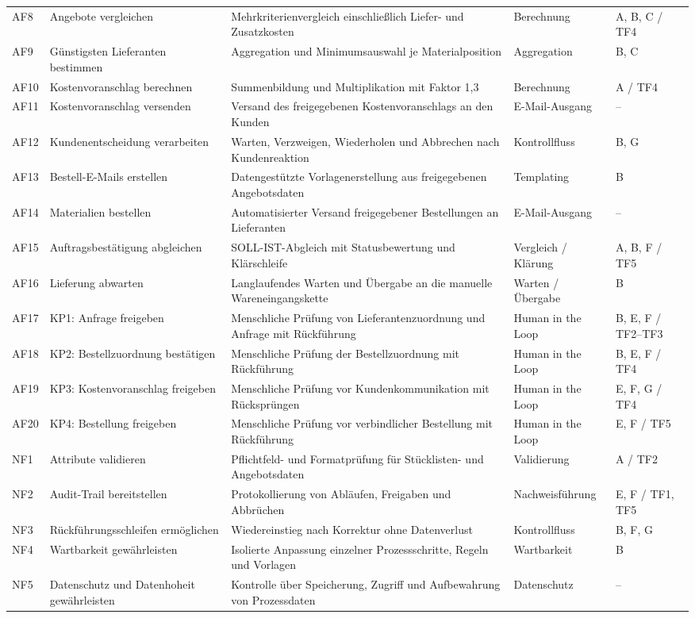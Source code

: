 \documentclass[a4paper,12pt]{article}
\begin{document}
\begin{landscape}
\begin{longtable}{@{}>{\centering\arraybackslash}p{1.35cm}p{5.8cm}p{9.2cm}p{3.4cm}>{\centering\arraybackslash}p{3.0cm}@{}}
    AF8 & Angebote vergleichen & Mehrkriterienvergleich einschließlich Liefer- und Zusatzkosten & Berechnung & A, B, C / TF4 \\
    AF9 & Günstigsten Lieferanten bestimmen & Aggregation und Minimumsauswahl je Materialposition & Aggregation & B, C \\
    AF10 & Kostenvoranschlag berechnen & Summenbildung und Multiplikation mit Faktor 1,3 & Berechnung & A / TF4 \\
    AF11 & Kostenvoranschlag versenden & Versand des freigegebenen Kostenvoranschlags an den Kunden & E-Mail-Ausgang & -- \\
    AF12 & Kundenentscheidung verarbeiten & Warten, Verzweigen, Wiederholen und Abbrechen nach Kundenreaktion & Kontrollfluss & B, G \\
    AF13 & Bestell-E-Mails erstellen & Datengestützte Vorlagenerstellung aus freigegebenen Angebotsdaten & Templating & B \\
    AF14 & Materialien bestellen & Automatisierter Versand freigegebener Bestellungen an Lieferanten & E-Mail-Ausgang & -- \\
    AF15 & Auftragsbestätigung abgleichen & SOLL-IST-Abgleich mit Statusbewertung und Klärschleife & Vergleich / Klärung & A, B, F / TF5 \\
    AF16 & Lieferung abwarten & Langlaufendes Warten und Übergabe an die manuelle Wareneingangskette & Warten / Übergabe & B \\
    AF17 & KP1: Anfrage freigeben & Menschliche Prüfung von Lieferantenzuordnung und Anfrage mit Rückführung & Human in the Loop & B, E, F / TF2--TF3 \\
    AF18 & KP2: Bestellzuordnung bestätigen & Menschliche Prüfung der Bestellzuordnung mit Rückführung & Human in the Loop & B, E, F / TF4 \\
    AF19 & KP3: Kostenvoranschlag freigeben & Menschliche Prüfung vor Kundenkommunikation mit Rücksprüngen & Human in the Loop & E, F, G / TF4 \\
    AF20 & KP4: Bestellung freigeben & Menschliche Prüfung vor verbindlicher Bestellung mit Rückführung & Human in the Loop & E, F / TF5 \\
    NF1 & Attribute validieren & Pflichtfeld- und Formatprüfung für Stücklisten- und Angebotsdaten & Validierung & A / TF2 \\
    NF2 & Audit-Trail bereitstellen & Protokollierung von Abläufen, Freigaben und Abbrüchen & Nachweisführung & E, F / TF1, TF5 \\
    NF3 & Rückführungsschleifen ermöglichen & Wiedereinstieg nach Korrektur ohne Datenverlust & Kontrollfluss & B, F, G \\
    NF4 & Wartbarkeit gewährleisten & Isolierte Anpassung einzelner Prozessschritte, Regeln und Vorlagen & Wartbarkeit & B \\
    NF5 & Datenschutz und Datenhoheit gewährleisten & Kontrolle über Speicherung, Zugriff und Aufbewahrung von Prozessdaten & Datenschutz & -- \\
    \bottomrule
\end{longtable}
\normalsize
\end{landscape}
\end{document}
